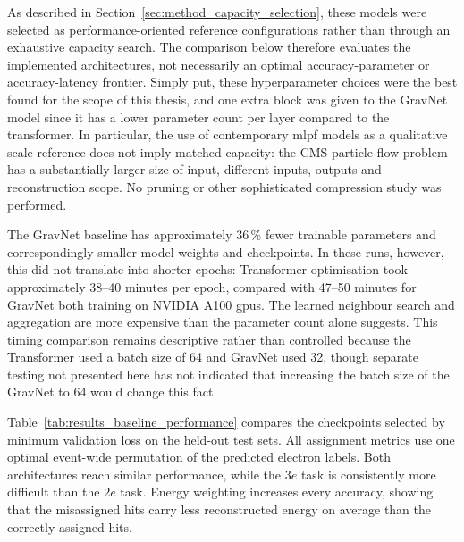 As described in Section~\ref{sec:method_capacity_selection}, these models were
selected as performance-oriented reference configurations rather than through
an exhaustive capacity search. The comparison below therefore evaluates the
implemented architectures, not necessarily an optimal accuracy-parameter or
accuracy-latency frontier. Simply put, these hyperparameter choices were the best found for the scope of this thesis, and one extra block was given to the GravNet model since it has a lower parameter count per layer compared to the transformer. In particular, the use of contemporary \gls{mlpf}
models as a qualitative scale reference does not imply matched capacity: the
CMS particle-flow problem has a substantially larger size of input, different inputs, outputs and reconstruction scope. No pruning or other sophisticated compression study was performed.


The GravNet baseline has approximately \(36\,\%\) fewer trainable parameters
and correspondingly smaller model weights and checkpoints. In these runs,
however, this did not translate into shorter epochs: Transformer optimisation
took approximately 38--40 minutes per epoch, compared with 47--50 minutes for
GravNet both training on NVIDIA A100 \gls{gpu}s. The learned neighbour search and aggregation are more expensive than
the parameter count alone suggests. This timing comparison remains
descriptive rather than controlled because the Transformer used a batch size
of 64 and GravNet used 32, though separate testing not presented here has not indicated that increasing the batch size of the GravNet to 64 would change this fact.

Table~\ref{tab:results_baseline_performance} compares the checkpoints selected
by minimum validation loss on the held-out test sets. All assignment metrics
use one optimal event-wide
permutation of the predicted electron labels. Both architectures reach similar
performance, while the \(3e\) task is consistently more difficult than the
\(2e\) task. Energy weighting increases every accuracy, showing that the
misassigned hits carry less reconstructed energy on average than the correctly
assigned hits.



